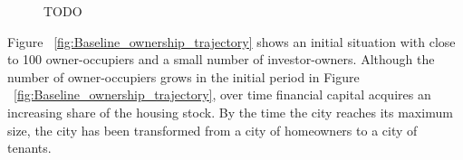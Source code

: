\begin{figure}
\centering
{}
\caption{TODO}
\label{fig:enter-label}
\end{figure}

 Figure ~\ref{fig:Baseline_ownership_trajectory} shows an initial situation with close to 100 owner-occupiers and a small number of investor-owners. Although the number of owner-occupiers grows in the initial period in Figure ~\ref{fig:Baseline_ownership_trajectory}, over time financial capital acquires an increasing share of the housing stock. By the time the city reaches its maximum size, the city has been transformed from a city of homeowners to a city of tenants.



